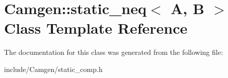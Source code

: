 \hypertarget{a00508}{\section{Camgen\-:\-:static\-\_\-neq$<$ A, B $>$ Class Template Reference}
\label{a00508}
}


The documentation for this class was generated from the following file\-:\begin{DoxyCompactItemize}
\item 
include/\-Camgen/static\-\_\-comp.\-h\end{DoxyCompactItemize}
